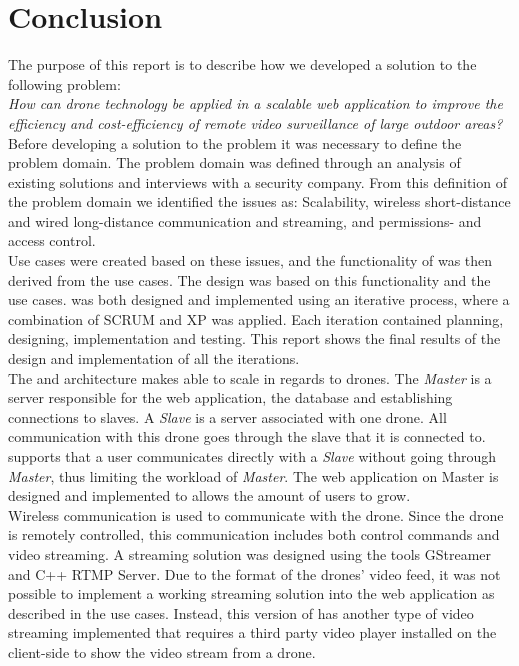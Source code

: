 
\section{Conclusion}
The purpose of this report is to describe how we developed a solution to the following problem: \\

\textit{How can drone technology be applied in a scalable web application to improve the efficiency and cost-efficiency of remote video surveillance of large outdoor areas?} \\

Before developing a solution to the problem it was necessary to define the problem domain.
The problem domain was defined through an analysis of existing solutions and interviews with a security company.
From this definition of the problem domain we identified the issues as: Scalability, wireless short-distance and wired long-distance communication and streaming, and permissions- and access control. \\

Use cases were created based on these issues, and the functionality of \projectname{} was then derived from the use cases. 
The design was based on this functionality and the use cases.
\projectname{} was both designed and implemented using an iterative process, where a combination of SCRUM and XP was applied. 
Each iteration contained planning, designing, implementation and testing. 
This report shows the final results of the design and implementation of all the iterations. \\

The  and  architecture makes \projectname{} able to scale in regards to drones. 
The \emph{Master} is a server responsible for the web application, the database and establishing connections to slaves.
A \emph{Slave} is a server associated with one drone. 
All communication with this drone goes through the slave that it is connected to. \\

\projectname{} supports that a user communicates directly with a \emph{Slave} without going through \emph{Master}, thus limiting the workload of \emph{Master}. 
The web application on Master is designed and implemented to allows the amount of users to grow. \\

Wireless communication is used to communicate with the drone. 
Since the drone is remotely controlled, this communication includes both control commands and video streaming.
A streaming solution was designed using the tools GStreamer and C++ RTMP Server.
Due to the format of the drones' video feed, it was not possible to implement a working streaming solution into the web application as described in the use cases.
Instead, this version of \projectname{} has another type of video streaming implemented that requires a third party video player installed on the client-side to show the video stream from a drone. \\


